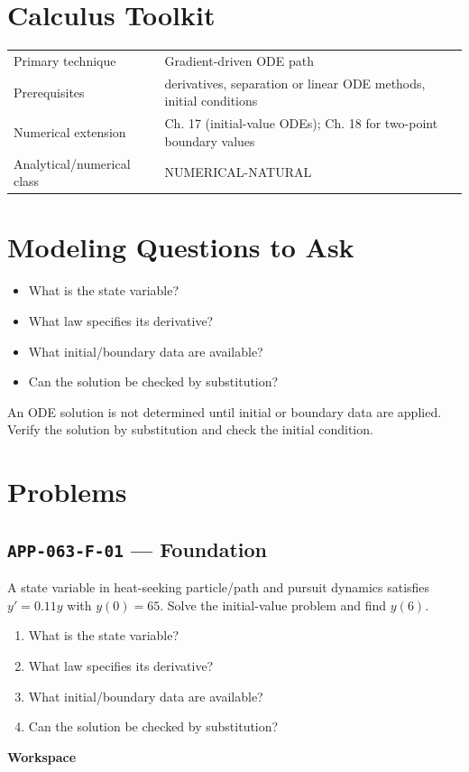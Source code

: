 \documentclass[11pt]{book}
\newcommand{\pid}[1]{\texttt{#1}}
\newcommand{\workspace}{\par\vspace{0.7in}\hrulefill\par\vspace{0.55in}\hrulefill\par}
\begin{document}
\section*{Calculus Toolkit}
\begin{tabularx}{\textwidth}{@{}lX@{}}\toprule
Primary technique & Gradient-driven ODE path \\
Prerequisites & derivatives, separation or linear ODE methods, initial conditions \\
Numerical extension & Ch. 17 (initial-value ODEs); Ch. 18 for two-point boundary values \\
Analytical/numerical class & NUMERICAL-NATURAL \\
\bottomrule\end{tabularx}
\section*{Modeling Questions to Ask}\begin{itemize}
\item What is the state variable?
\item What law specifies its derivative?
\item What initial/boundary data are available?
\item Can the solution be checked by substitution?
\end{itemize}
\begin{errorbox}An ODE solution is not determined until initial or boundary data are applied. Verify the solution by substitution and check the initial condition.\end{errorbox}
\section*{Problems}
\subsection*{\pid{APP-063-F-01} — Foundation}
\begin{problembox}
A state variable in heat-seeking particle/path and pursuit dynamics satisfies $y'=0.11y$ with $y(0)=65$. Solve the initial-value problem and find $y(6)$.
\end{problembox}
\begin{promptbox}\begin{enumerate}
\item What is the state variable?
\item What law specifies its derivative?
\item What initial/boundary data are available?
\item Can the solution be checked by substitution?
\end{enumerate}\end{promptbox}
\textbf{Workspace}\workspace
{}
\end{document}
